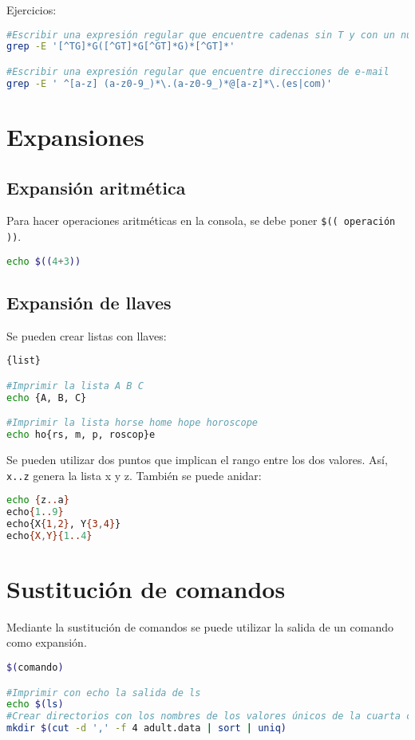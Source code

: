 Ejercicios: 
\begin{lstlisting}[language=bash]
#Escribir una expresión regular que encuentre cadenas sin T y con un número impar de G
grep -E '[^TG]*G([^GT]*G[^GT]*G)*[^GT]*'

#Escribir una expresión regular que encuentre direcciones de e-mail
grep -E ' ^[a-z] (a-z0-9_)*\.(a-z0-9_)*@[a-z]*\.(es|com)'
\end{lstlisting}

\section{Expansiones}
\subsection{Expansión aritmética}
Para hacer operaciones aritméticas en la consola, se debe poner \texttt{\$(( operación ))}. 
\begin{lstlisting}[language=bash]
echo $((4+3))
\end{lstlisting}

\subsection{Expansión de llaves}
Se pueden crear listas con llaves:
\begin{lstlisting}[language=bash]
{list}

#Imprimir la lista A B C
echo {A, B, C}

#Imprimir la lista horse home hope horoscope
echo ho{rs, m, p, roscop}e
\end{lstlisting}

Se pueden utilizar dos puntos que implican el rango entre los dos valores. Así, \texttt{{x..z}} genera la lista x y z. También se puede anidar:
\begin{lstlisting}[language=bash]
echo {z..a}
echo{1..9}
echo{X{1,2}, Y{3,4}}
echo{X,Y}{1..4}
\end{lstlisting}

\section{Sustitución de comandos}
Mediante la sustitución de comandos se puede utilizar la salida de un comando como expansión.
\begin{lstlisting}[language=bash]
$(comando)

#Imprimir con echo la salida de ls
echo $(ls)
#Crear directorios con los nombres de los valores únicos de la cuarta columna de adult.data
mkdir $(cut -d ',' -f 4 adult.data | sort | uniq)
\end{lstlisting}

